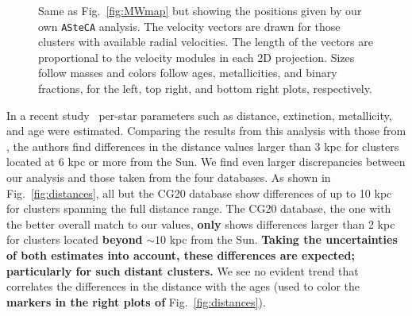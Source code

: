 \documentclass[referee]{aa}
\begin{document}
  \begin{figure}
   \caption{Same as Fig.~\ref{fig:MWmap} but showing the positions given by our
   own \texttt{ASteCA} analysis. The velocity vectors are drawn for those
   clusters with available radial velocities. The length of the vectors are
   proportional to the velocity modules in each 2D projection. Sizes follow
   masses and colors follow ages, metallicities, and binary fractions, for the
   left, top right, and bottom right plots, respectively.}
   \label{fig:MWmap_vectors}
  \end{figure}

  In a recent study~\citep{Anders_2021} per-star parameters such as distance,
  extinction, metallicity, and age were estimated. Comparing the results
  from this analysis with those from \cite{Cantat_2020}, the authors find
  differences in the distance values larger than 3 kpc for clusters located at
  6 kpc or more from the Sun. We find even larger discrepancies between our
  analysis and those taken from the four databases. As shown in
  Fig.~\ref{fig:distances}, all but the CG20 database show differences of up
  to 10 kpc for clusters spanning the full distance range. The CG20
  database, the one with the better overall match to our values, \textbf{only}
  shows differences larger than 2 kpc for clusters located \textbf{beyond}
  $\sim10$ kpc from the Sun. \textbf{Taking the uncertainties of both estimates
  into account, these differences are expected; particularly for such distant
  clusters.}
  We see no evident trend that correlates the differences in the distance with
  the ages (used to color the \textbf{markers in the right plots of}
  Fig.~\ref{fig:distances}).\\
\end{document}
